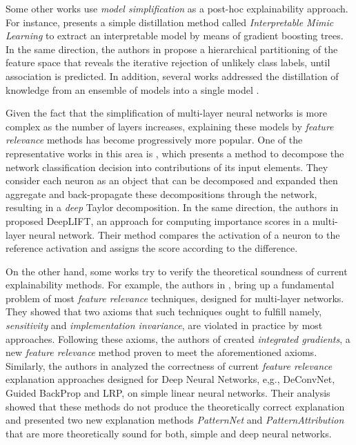 \documentclass[final]{elsarticle}
\begin{document}
Some other works use \textit{model simplification} as a post-hoc explainability approach. For instance, \cite{InterpretableDeepICU} presents a simple distillation method called \emph{Interpretable Mimic Learning} to extract an interpretable model by means of gradient boosting trees. In the same direction, the authors in \cite{TreeView} propose a hierarchical partitioning of the feature space that reveals the iterative rejection of unlikely class labels, until association is predicted. In addition, several works addressed the distillation of knowledge from  an ensemble of models into a single model \cite{hinton2015distilling,bucilua2006model,Traore19} .

Given the fact that the simplification of  multi-layer neural networks is more complex as the number of layers increases, explaining these models by \textit{feature relevance} methods has become progressively more popular. One of the representative works in this area is \cite{DeepTaylor}, which presents a method to decompose the network classification decision into contributions of its input elements. They consider each neuron as an object that can be decomposed and expanded then aggregate and back-propagate these decompositions through the network, resulting in a \emph{deep} Taylor decomposition. In the same direction, the authors in \cite{shrikumar2016not} proposed DeepLIFT, an approach for computing importance scores in a multi-layer neural network. Their method compares the activation of a neuron to the reference activation and assigns the score according to the difference. 

On the other hand, some works try to verify the theoretical soundness of current explainability methods. For example, the authors in \cite{Axiomatic},  bring up a fundamental problem of most \textit{feature relevance} techniques, designed for multi-layer networks. They showed that two axioms that such techniques ought to fulfill namely, \emph{sensitivity} and \emph{implementation invariance}, are violated in practice by most approaches. Following these axioms, the authors of \cite{Axiomatic} created \emph{integrated gradients}, a new \textit{feature relevance} method proven to meet the aforementioned axioms. Similarly, the authors in \cite{LearningHowTo} analyzed the correctness of  current  \textit{feature relevance} explanation approaches designed for Deep Neural Networks, e,g., DeConvNet, Guided BackProp and LRP, on simple linear neural networks. Their analysis showed that these methods do not  produce the theoretically correct explanation and presented two new explanation methods \textit{PatternNet} and \textit{PatternAttribution} that are more theoretically sound for both, simple and deep neural networks.
\end{document}

